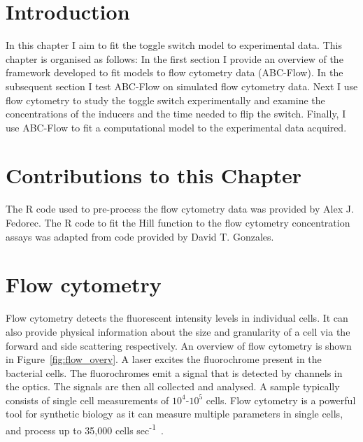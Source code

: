 \section{Introduction}

In this chapter I aim to fit the toggle switch model to experimental data. This chapter is organised as follows: In the first section I provide an overview of the framework developed to fit models to flow cytometry data (ABC-Flow). In the subsequent section I test ABC-Flow on simulated flow cytometry data. Next I use flow cytometry to study the toggle switch experimentally and examine the concentrations of the inducers and the time needed to flip the switch. Finally, I use ABC-Flow to fit a computational model to the experimental data acquired.


\section{Contributions to this Chapter}

The R code used to pre-process the flow cytometry data was provided by Alex J. Fedorec. The R code to fit the Hill function to the flow cytometry concentration assays was adapted from code provided by David T. Gonzales. 

\section{Flow cytometry}
Flow cytometry detects the fluorescent intensity levels in individual cells. It can also provide physical information about the size and granularity of a cell via the forward and side scattering respectively. An overview of flow cytometry is shown in Figure~\ref{fig:flow_overv}. A laser excites the fluorochrome present in the bacterial cells. The fluorochromes emit a signal that is detected by channels in the optics. The signals are then all collected and analysed. A sample typically consists of single cell measurements of $10^4$-$10^5$ cells. %
Flow cytometry is a powerful tool for synthetic biology as it can measure multiple parameters in single cells, and process up to 35,000 cells sec\textsuperscript{-1}~\autocite{Anonymous:2015tj}. 


